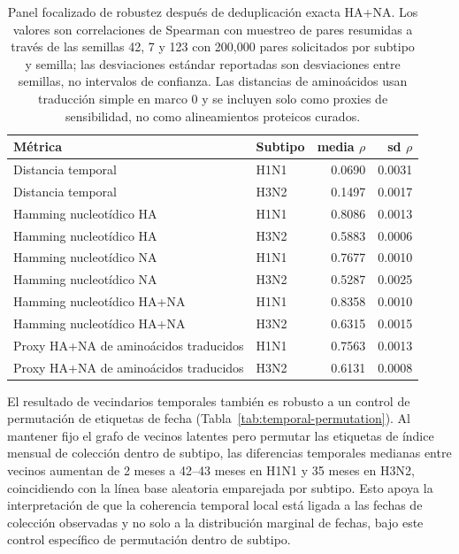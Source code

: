\documentclass[11pt]{article}
\begin{document}
\begin{table}[H]
\centering
\caption{Panel focalizado de robustez después de deduplicación exacta HA+NA. Los valores son correlaciones de Spearman con muestreo de pares resumidas a través de las semillas 42, 7 y 123 con 200,000 pares solicitados por subtipo y semilla; las desviaciones estándar reportadas son desviaciones entre semillas, no intervalos de confianza. Las distancias de aminoácidos usan traducción simple en marco 0 y se incluyen solo como proxies de sensibilidad, no como alineamientos proteicos curados.}
\label{tab:robust-spearman}
\begin{tabular}{llrr}
\toprule
Métrica & Subtipo & media $\rho$ & sd $\rho$ \\
\midrule
Distancia temporal & H1N1 & 0.0690 & 0.0031 \\
Distancia temporal & H3N2 & 0.1497 & 0.0017 \\
Hamming nucleotídico HA & H1N1 & 0.8086 & 0.0013 \\
Hamming nucleotídico HA & H3N2 & 0.5883 & 0.0006 \\
Hamming nucleotídico NA & H1N1 & 0.7677 & 0.0010 \\
Hamming nucleotídico NA & H3N2 & 0.5287 & 0.0025 \\
Hamming nucleotídico HA+NA & H1N1 & 0.8358 & 0.0010 \\
Hamming nucleotídico HA+NA & H3N2 & 0.6315 & 0.0015 \\
Proxy HA+NA de aminoácidos traducidos & H1N1 & 0.7563 & 0.0013 \\
Proxy HA+NA de aminoácidos traducidos & H3N2 & 0.6131 & 0.0008 \\
\bottomrule
\end{tabular}
\end{table}

El resultado de vecindarios temporales también es robusto a un control de permutación de etiquetas de fecha (Tabla~\ref{tab:temporal-permutation}). Al mantener fijo el grafo de vecinos latentes pero permutar las etiquetas de índice mensual de colección dentro de subtipo, las diferencias temporales medianas entre vecinos aumentan de 2 meses a 42--43 meses en H1N1 y 35 meses en H3N2, coincidiendo con la línea base aleatoria emparejada por subtipo. Esto apoya la interpretación de que la coherencia temporal local está ligada a las fechas de colección observadas y no solo a la distribución marginal de fechas, bajo este control específico de permutación dentro de subtipo.
\end{document}
